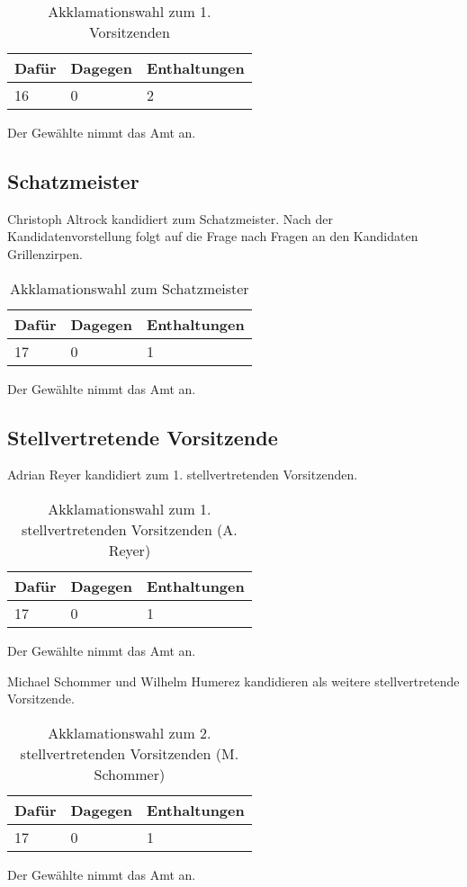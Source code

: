 \documentclass[a4paper]{scrartcl}
\begin{document}
\begin{table}[h]
	\begin{tabularx}{\textwidth}{XXX}
		Dafür & Dagegen & Enthaltungen\\
		\toprule
		16 & 0 & 2\\
	\end{tabularx}
	\caption{Akklamationswahl zum 1. Vorsitzenden}
\end{table}
Der Gewählte nimmt das Amt an.

\subsection{Schatzmeister}
Christoph Altrock kandidiert zum Schatzmeister.
Nach der Kandidatenvorstellung folgt auf die Frage nach Fragen an den Kandidaten Grillenzirpen.

\begin{table}[h]
	\begin{tabularx}{\textwidth}{XXX}
		Dafür & Dagegen & Enthaltungen\\
		\toprule
		17 & 0 & 1\\
	\end{tabularx}
	\caption{Akklamationswahl zum Schatzmeister}
\end{table}
Der Gewählte nimmt das Amt an.

\subsection{Stellvertretende Vorsitzende}
Adrian Reyer kandidiert zum 1. stellvertretenden Vorsitzenden.

\begin{table}[h]
	\begin{tabularx}{\textwidth}{XXX}
		Dafür & Dagegen & Enthaltungen\\
		\toprule
		17 & 0 & 1\\
	\end{tabularx}
	\caption{Akklamationswahl zum 1. stellvertretenden Vorsitzenden (A. Reyer)}
\end{table}
Der Gewählte nimmt das Amt an.

\clearpage

Michael Schommer und Wilhelm Humerez kandidieren als weitere stellvertretende Vorsitzende.

\begin{table}[h]
	\begin{tabularx}{\textwidth}{XXX}
		Dafür & Dagegen & Enthaltungen\\
		\toprule
		17 & 0 & 1\\
	\end{tabularx}
	\caption{Akklamationswahl zum 2. stellvertretenden Vorsitzenden (M. Schommer)}
\end{table}
Der Gewählte nimmt das Amt an.
\end{document}
